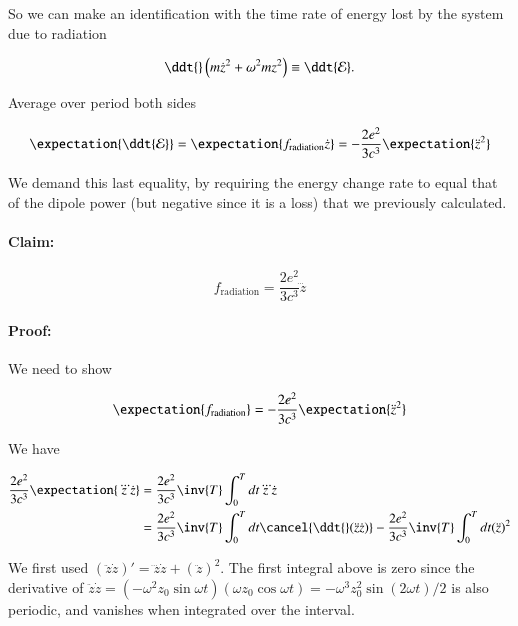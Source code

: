 So we can make an identification with the time rate of energy lost by the system due to radiation

\begin{equation}\label{eqn:relativisticElectrodynamicsL26:270}
\ddt{} 
\left( m \dot{z}^2 + \omega^2 m z^2 \right) 
\equiv \ddt{\mathcal{E}}.
\end{equation}

Average over period both sides

\begin{equation}\label{eqn:relativisticElectrodynamicsL26:290}
\expectation{ \ddt{\mathcal{E}} } = 
\expectation{ f_{\text{radiation}} \dot{z} }
=
- \frac{2 e^2 }{3 c^3} \expectation{\ddot{z}^2}
\end{equation}

We demand this last equality, by requiring the energy change rate to equal that of the dipole power (but negative since it is a loss) that we previously calculated.

\paragraph{Claim:} 

\begin{equation}\label{eqn:relativisticElectrodynamicsL26:310}
f_{\text{radiation}} = \frac{2 e^2 }{3 c^3} \dddot{z}
\end{equation}

\paragraph{Proof:} 

We need to show 

\begin{equation}\label{eqn:relativisticElectrodynamicsL26:330}
\expectation{ f_{\text{radiation}} }
= - \frac{2 e^2 }{3 c^3} \expectation{\ddot{z}^2}
\end{equation}

We have

\begin{align*}
\frac{2 e^2}{3 c^3} \expectation{ \dddot{z} \dot{z} } 
&= \frac{2 e^2}{3 c^3} \inv{T} \int_0^T dt \dddot{z} \dot{z} \\
&= 
\frac{2 e^2}{3 c^3} \inv{T} \int_0^T dt \cancel{\ddt{} (\ddot{z} \dot{z}) }
-\frac{2 e^2}{3 c^3} \inv{T} \int_0^T dt (\ddot{z})^2
\end{align*}

We first used $(\ddot{z} \dot{z})' = \dddot{z} \dot{z} + (\ddot{z})^2$.  The first integral above is zero since the derivative of $\ddot{z} \dot{z} = (-\omega^2 z_0 \sin\omega t)(\omega z_0 \cos\omega t) = -\omega^3 z_0^2 \sin(2 \omega t)/2$ is also periodic, and vanishes when integrated over the interval.  

